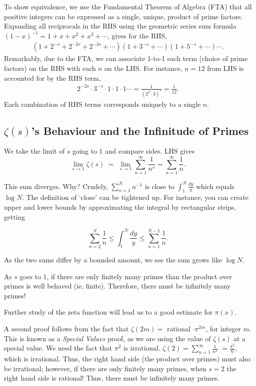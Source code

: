 \documentclass[12pt,letterpaper]{report}
\newcommand\be{\begin{equation}}
\newcommand\ee{\end{equation}}
\newcommand\bea{\begin{eqnarray}}
\newcommand\eea{\end{eqnarray}}
\begin{document}
To show equivalence, we use the Fundamental Theorem of Algebra
(FTA) that all positive integers can be expressed as a single,
unique, product of prime factors. Expanding all reciprocals in the
RHS using the geometric series sum formula $(1-x)^{-1} = 1 + x +
x^2 + x^3 + \cdots$, gives for the RHS, \bea (1 + 2^{-s} + 2^{-2s}
+ 2^{-3s} + \cdots) (1 + 3^{-s} + \cdots )(1 + 5^{-s} + \cdots)
\cdots. \nonumber \eea Remarkably, due to the FTA, we can
associate 1-to-1 each term (choice of prime factors) on the RHS
with each $n$ on the LHS. For instance, $n = 12$ from LHS is
accounted for by the RHS term, \bea
2^{-2s}\cdot3^{-s}\cdot1\cdot1\cdot1\cdots = \frac{1}{(2^2 \cdot
3)^s}
 = \frac{1}{12}.
\nonumber \eea Each combination of RHS terms corresponds uniquely
to a single $n$.

\subsection{$\zeta(s)$'s Behaviour and the Infinitude of Primes}

We take the limit of $s$ going to 1 and compare sides. LHS gives
\be \lim_{s\rightarrow1} \zeta(s) \; = \; \lim_{s\rightarrow1}
\sum_{n=1}^\infty \frac{1}{n^s} = \sum_{n=1}^\infty \frac{1}{n}.
\ee

This sum diverges. Why? Crudely, $\sum_{n=1}^N n^{-1}$ is close to
$\int_1^N \frac{dy}{y}$ which equals $\log N$. The definition of
`close' can be tightened up. For instance, you can create upper
and lower bounds by approximating the integral by rectangular
strips, getting

\be \sum_{n=2}^N \frac{1}{n} \le \int_1^N \frac{dy}{y} \le
\sum_{n=1}^{N-1} \frac{1}{n}. \ee

As the two sums differ by a bounded amount, we see the sum grows
like $\log N$.

As $s$ goes to $1$, if there are only finitely many primes than
the product over primes is well behaved (ie, finite). Therefore,
there must be infinitely many primes!

Further study of the zeta function will lead us to a good estimate
for $\pi(x)$.

A second proof follows from the fact that $\zeta(2m) = $ rational
$ \cdot \pi^{2m}$, for integer $m$. This is known as a
\emph{Special Values} proof, as we are using the value of
$\zeta(s)$ at a special value. We need the fact that $\pi^2$ is
irrational. $\zeta(2) = \sum_{n=1}^\infty \frac{1}{n^2}$ $=
\frac{\pi^2}{6}$, which is irrational. Thus, the right hand side
(the product over primes) must also be irrational; however, if
there are only finitely many primes, when $s = 2$ the right hand
side is rational! Thus, there must be infinitely many primes.
\end{document}
